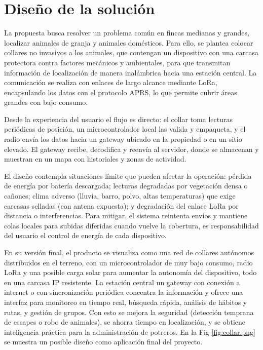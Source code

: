 \documentclass[journal]{IEEEtran}
\begin{document}
\section{Diseño de la solución}

La propuesta busca resolver un problema común en fincas medianas y grandes, localizar animales de granja y animales domésticos. Para ello, se plantea colocar collares no invasivos a los animales, que contengan un dispositivo con una carcasa protectora contra factores mecánicos y ambientales, para que transmitan información de localización de manera inalámbrica hacia una estación central. La comunicación se realiza con enlaces de largo alcance mediante LoRa, encapsulando los datos con el protocolo APRS, lo que permite cubrir áreas grandes con bajo consumo.

Desde la experiencia del usuario el flujo es directo: el collar toma lecturas periódicas de posición, un microcontrolador local las valida y empaqueta, y el radio envía los datos hacia un gateway ubicado en la propiedad o en un sitio elevado. El gateway recibe, decodifica y reenvía al servidor, donde se almacenan y muestran en un mapa con historiales y zonas de actividad.

El diseño contempla situaciones límite que pueden afectar la operación: pérdida de energía por batería descargada; lecturas degradadas por vegetación densa o cañones; clima adverso (lluvia, barro, polvo, altas temperaturas) que exige carcasas selladas (con antena expuesta); y degradación del enlace LoRa por distancia o interferencias. Para mitigar, el sistema reintenta envíos y mantiene colas locales para subidas diferidas cuando vuelve la cobertura, es responsabilidad del usuario el control de energía de cada dispositivo.

En su versión final, el producto se visualiza como una red de collares autónomos distribuidos en el terreno, con un microcontrolador de muy bajo consumo, radio LoRa y una posible carga solar para aumentar la autonomía del dispositivo, todo en una carcasa IP resistente. La estación central un gateway con conexión a internet o con sincronización periódica concentra la información y ofrece una interfaz para monitoreo en tiempo real, búsqueda rápida, análisis de hábitos y rutas, y gestión de grupos. Con esto se mejora la seguridad (detección temprana de escapes o robo de animales), se ahorra tiempo en localización, y se obtiene inteligencia práctica para la administración de potreros. En la Fig \ref{fig:collar.png} se muestra un posible diseño como aplicación final del proyecto.
\end{document}

